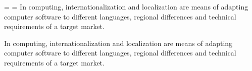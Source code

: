 \hsize 3in \vsize=1.4in  
\headline={\hrulefill} \footline={\hrulefill}
\hoffset=-1in \voffset=-1in
\noindent In computing, internationalization and localization
are means of adapting computer software to different
languages, regional differences and technical
requirements of a target market.

\noindent In computing, internationalization and localization
are means of adapting computer software to different
languages, regional differences and technical
requirements of a target market.
\bye
